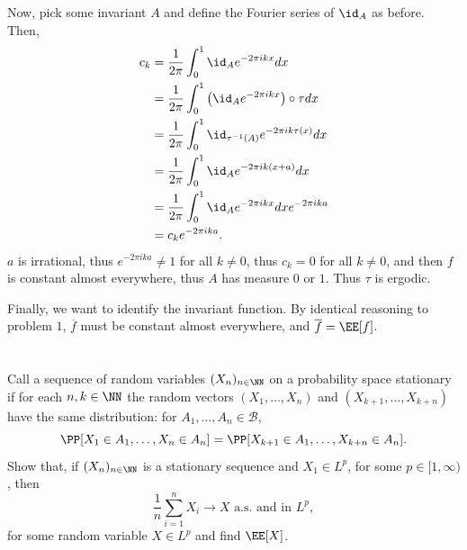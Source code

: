 \documentclass[11pt, headheight=30pt]{scrartcl}
\newcommand{\BBB}{\mathscr{B}}
\begin{document}
Now, pick some invariant $A$ and define the Fourier series of $\id_A$ as before. Then,
\begin{align*}
    c_k &= \frac{1}{2\pi}\int_0^1 \id_A e^{-2\pi i k x} dx\\
    &= \frac{1}{2\pi}\int_0^1 \left(\id_A e^{-2\pi i k x}\right)\circ \tau dx \\
    &= \frac{1}{2\pi}\int_0^1 \id_{\tau^{-1}(A)} e^{-2\pi i k \tau(x)} dx \\
    &= \frac{1}{2\pi}\int_0^1 \id_{A} e^{-2\pi i k (x+a)} dx \\
    &= \frac{1}{2\pi}\int_0^1 \id_{A} e^{-2\pi i k x} dx e^{-2\pi i k a} \\
    &= c_k e^{-2\pi i k a}.
\end{align*}
$a$ is irrational, thus  $e^{-2\pi i ka} \neq 1$ for all $k\neq 0$,
thus $c_k = 0$ for all $k \neq 0$, and then $f$ is
constant almost everywhere, thus $A$ has measure $0$ or $1$.
Thus $\tau$ is ergodic. 

Finally, we want to identify the invariant function. %
By identical reasoning to problem $1$, $\overline{f}$ must be constant almost everywhere,
and $\overline{f} = \EE[f]$.

\section{}
\begin{prob*}
    Call a sequence of random variables $(X_n)_{n \in \NN}$ on a probability space
    stationary if for each $n, k \in \NN$ the random vectors
    $(X_1, \ldots, X_n)$ and $(X_{k+1}, \ldots, X_{k+n})$ have the same distribution:
    for $A_1, \ldots, A_n \in \BBB$,
    \[
        \PP[X_1 \in A_1, \ldots, X_n \in A_n] = \PP[X_{k+1} \in A_1, \ldots, X_{k+n} \in A_n].
    \]
    Show that, if $(X_n)_{n \in \NN}$ is a stationary sequence and $X_1 \in L^p$,
    for some $p \in [1, \infty)$, then
    \[
        \frac{1}{n} \sum_{i=1}^n X_i \to X \text{ a.s. and in } L^p,
    \]
    for some random variable $X \in L^p$ and find $\EE[X]$.
\end{prob*}
\end{document}
